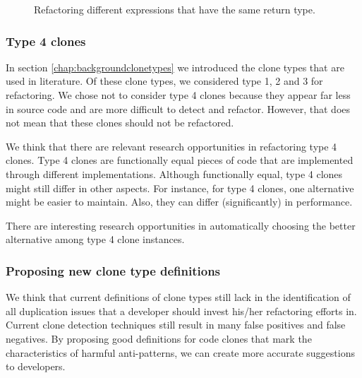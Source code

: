 \begin{figure}[H]
\begin{parcolumns}{2}
\end{parcolumns}
\caption{Refactoring different expressions that have the same return type.}
\label{fig:samereturn}
\end{figure}

\subsubsection{Type 4 clones}
In section \ref{chap:backgroundclonetypes} we introduced the clone types that are used in literature. Of these clone types, we considered type 1, 2 and 3 for refactoring. We chose not to consider type 4 clones because they appear far less in source code and are more difficult to detect and refactor. However, that does not mean that these clones should not be refactored.

We think that there are relevant research opportunities in refactoring type 4 clones. Type 4 clones are functionally equal pieces of code that are implemented through different implementations. Although functionally equal, type 4 clones might still differ in other aspects. For instance, for type 4 clones, one alternative might be easier to maintain. Also, they can differ (significantly) in performance.

There are interesting research opportunities in automatically choosing the better alternative among type 4 clone instances.

\subsubsection{Proposing new clone type definitions}
We think that current definitions of clone types still lack in the identification of all duplication issues that a developer should invest his/her refactoring efforts in. Current clone detection techniques still result in many false positives and false negatives. By proposing good definitions for code clones that mark the characteristics of harmful anti-patterns, we can create more accurate suggestions to developers.

